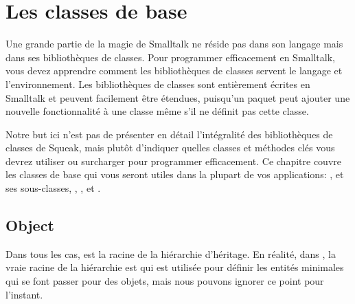 \documentclass[a4paper,10pt,twoside]{book}
\begin{document}
	\renewcommand{\nnbb}[2]{} %
	\sloppy
\fi
\chapter{Les classes de base}
\label{cha:basic}
Une grande partie de la magie de Smalltalk ne réside pas dans son langage mais dans ses bibliothèques de classes. Pour programmer efficacement en Smalltalk, vous devez apprendre comment les bibliothèques de classes servent le langage et l'environnement. Les bibliothèques de classes sont entièrement écrites en Smalltalk et peuvent facilement être étendues, puisqu'un paquet peut ajouter une nouvelle fonctionnalité à une classe même s'il ne définit pas cette classe. 

Notre but ici n'est pas de présenter en détail l'intégralité des bibliothèques de classes de Squeak, mais plutôt d'indiquer quelles classes et méthodes clés vous devrez utiliser ou surcharger pour programmer efficacement. Ce chapitre couvre les classes de base qui vous seront utiles dans la plupart de vos applications: ,  et ses sous-classes, , ,  et .


\section{Object}

Dans tous les cas,  est la racine de la hiérarchie d'héritage. En réalité, dans \squeak, la vraie racine de la hiérarchie est  qui est utilisée pour définir les entités minimales qui se font passer pour des objets, mais nous pouvons ignorer ce point pour l'instant.
\end{document}
